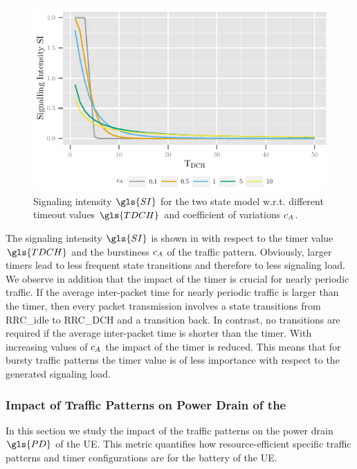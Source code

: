 \begin{figure}
	\centering
	\includegraphics{network/performance_model/numerical_examples/figures/2state_tdch_si}
	\caption{Signaling intensity \(\gls{SI}\) for the two state model w.r.t. different timeout values \(\gls{TDCH}\) and coefficient of variations \(c_{A}\).}
	\label{fig:network:performance_model:numerical_examples:validations:analytic_vs_simulation:2state_tdch_si}
\end{figure}


The signaling intensity \(\gls{SI}\) is shown in  with respect to the timer value \(\gls{TDCH}\) and the burstiness \(c_{A}\) of the traffic pattern.
Obviously, larger timers lead to less frequent state transitions and therefore to less signaling load.
We observe in addition that the impact of the timer is crucial for nearly periodic traffic.
If the average inter-packet time for nearly periodic traffic is larger than the timer, then every packet transmission involves a state transitions from \gls{RRC_idle} to \gls{RRC_DCH} and a transition back.
In contrast, no transitions are required if the average inter-packet time is shorter than the timer.
With increasing values of \(c_{A}\) the impact of the timer is reduced.
This means that for bursty traffic patterns the timer value is of less importance with respect to the generated signaling load.

\subsubsection*{Impact of Traffic Patterns on Power Drain of the }\label{sec:network:performance_model:power_drain}
In this section we study the impact of the traffic patterns on the power drain \(\gls{PD}\) of the \gls{UE}.
This metric quantifies how resource-efficient specific traffic patterns and timer configurations are for the battery of the \gls{UE}.

